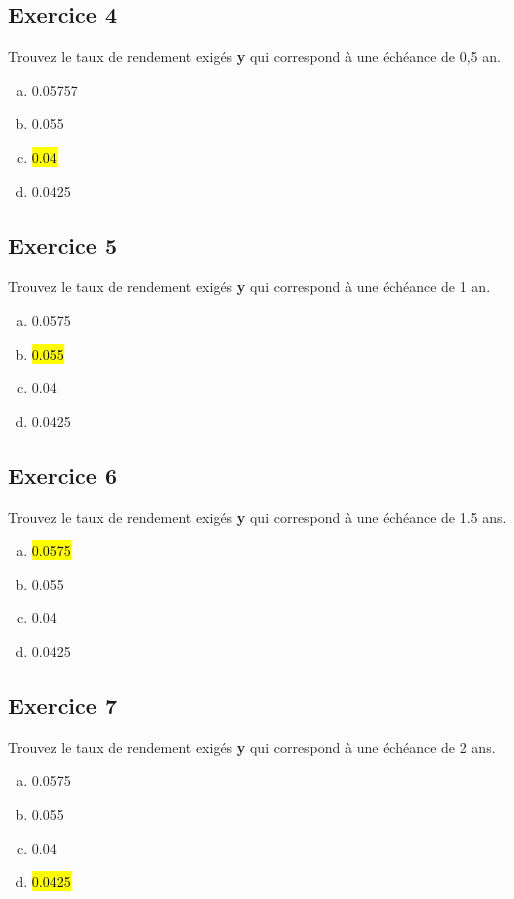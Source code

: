 \documentclass[10pt,a4paper]{article}
\begin{document}
\subsection*{Exercice 4}
Trouvez le taux de rendement exigés \textbf{y} qui correspond à une échéance de 0,5 an.

\begin{enumerate}[a)]
\item 0.05757
\item 0.055
\item  \hl{0.04}
\item 0.0425
\end{enumerate}

\subsection*{Exercice 5}
Trouvez le taux de rendement exigés \textbf{y} qui correspond à une échéance de 1 an.

\begin{enumerate}[a)]
\item 0.0575
\item  \hl{0.055}
\item 0.04
\item 0.0425
\end{enumerate}

\subsection*{Exercice 6}
Trouvez le taux de rendement exigés \textbf{y} qui correspond à une échéance de 1.5 ans.

\begin{enumerate}[a)]
\item  \hl{0.0575}
\item 0.055
\item 0.04
\item 0.0425
\end{enumerate}

\subsection*{Exercice 7}
Trouvez le taux de rendement exigés \textbf{y} qui correspond à une échéance de 2 ans.

\begin{enumerate}[a)]
\item 0.0575
\item 0.055
\item 0.04
\item  \hl{0.0425}
\end{enumerate}
\end{document}
